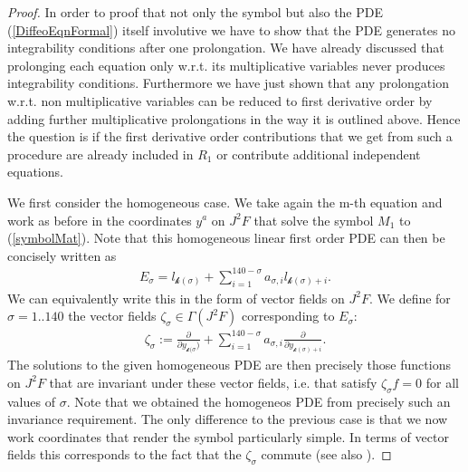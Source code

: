 \documentclass[a4paper,12pt, DIV=14, BCOR=5mm, twoside, headsepline]{scrbook}
\begin{document}
\begin{proof}
In order to proof that not only the symbol but also the PDE (\ref{DiffeoEqnFormal}) itself involutive we have to show that the PDE generates no integrability conditions after one prolongation. We have already discussed that prolonging each equation only w.r.t. its multiplicative variables never produces integrability conditions. Furthermore we have just shown that any prolongation w.r.t. non multiplicative variables can be reduced to first derivative order by adding further multiplicative prolongations in the way it is outlined above. Hence the question is if the first derivative order contributions that we get from such a procedure are already included in $R_1$ or contribute additional independent equations. 

We first consider the homogeneous case. We take again the m-th equation and work as before in the coordinates $y^a$ on $J^2F$ that solve the symbol $M_1$ to (\ref{symbolMat}). Note that this homogeneous linear first order PDE can then be concisely written as
\begin{align}
    E_{\sigma} = l_{\mathcal{k}(\sigma)} + \sum_{i = 1}^{140-\sigma} a_{\sigma,i} l_{\mathcal{k}(\sigma)+i} .
\end{align}
We can equivalently write this in the form of vector fields on $J^2F$. We define for $\sigma = 1..140$ the vector fields $\zeta_{\sigma} \in \Gamma(J^2F) $ corresponding to $E_{\sigma}$:
\begin{align}
    \zeta_{\sigma} := \frac{\partial}{\partial y_{\mathcal{k}(\sigma})} + \sum_{i = 1}^{140-\sigma} a_{\sigma,i} \frac{\partial}{\partial y_{\mathcal{k}(\sigma)+i}}.
\end{align}
The solutions to the given homogeneous PDE are then precisely those functions on $J^2F$ that are invariant under these vector fields, i.e. that satisfy $\zeta_{\sigma} f = 0$ for all values of $\sigma$.
Note that we obtained the homogeneos PDE from precisely such an invariance requirement. The only difference to the previous case is that we now work coordinates that render the symbol particularly simple. 
In terms of vector fields this corresponds to the fact that the $\zeta_{\sigma}$ commute (see also \cite{seiler1994analysis}).
%
%
%


\end{proof}
\end{document}
